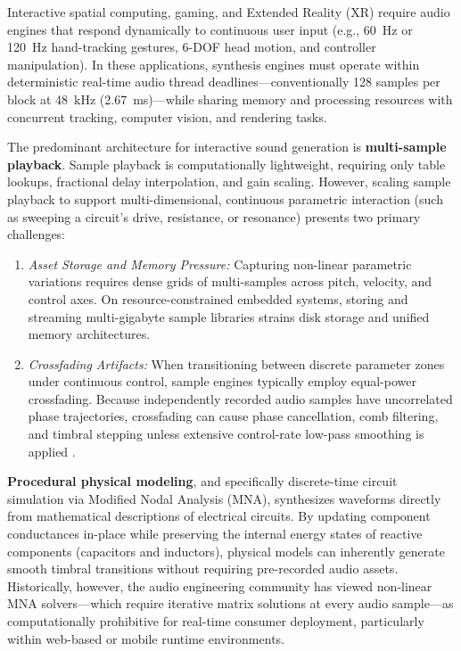 \documentclass[fleqn,draft]{jaes}
\begin{document}
Interactive spatial computing, gaming, and Extended Reality (XR) require audio engines that respond dynamically to continuous user input (e.g., 60~Hz or 120~Hz hand-tracking gestures, 6-DOF head motion, and controller manipulation). In these applications, synthesis engines must operate within deterministic real-time audio thread deadlines---conventionally 128 samples per block at 48~kHz (2.67~ms)---while sharing memory and processing resources with concurrent tracking, computer vision, and rendering tasks.

The predominant architecture for interactive sound generation is \textbf{multi-sample playback}. Sample playback is computationally lightweight, requiring only table lookups, fractional delay interpolation, and gain scaling. However, scaling sample playback to support multi-dimensional, continuous parametric interaction (such as sweeping a circuit's drive, resistance, or resonance) presents two primary challenges:
\begin{enumerate}
\item \textit{Asset Storage and Memory Pressure:} Capturing non-linear parametric variations requires dense grids of multi-samples across pitch, velocity, and control axes. On resource-constrained embedded systems, storing and streaming multi-gigabyte sample libraries strains disk storage and unified memory architectures.
\item \textit{Crossfading Artifacts:} When transitioning between discrete parameter zones under continuous control, sample engines typically employ equal-power crossfading. Because independently recorded audio samples have uncorrelated phase trajectories, crossfading can cause phase cancellation, comb filtering, and timbral stepping unless extensive control-rate low-pass smoothing is applied \cite{serafin2016virtual, turchet2021smart}.
\end{enumerate}

\textbf{Procedural physical modeling}, and specifically discrete-time circuit simulation via Modified Nodal Analysis (MNA), synthesizes waveforms directly from mathematical descriptions of electrical circuits. By updating component conductances in-place while preserving the internal energy states of reactive components (capacitors and inductors), physical models can inherently generate smooth timbral transitions without requiring pre-recorded audio assets. Historically, however, the audio engineering community has viewed non-linear MNA solvers---which require iterative matrix solutions at every audio sample---as computationally prohibitive for real-time consumer deployment, particularly within web-based or mobile runtime environments.
\end{document}
